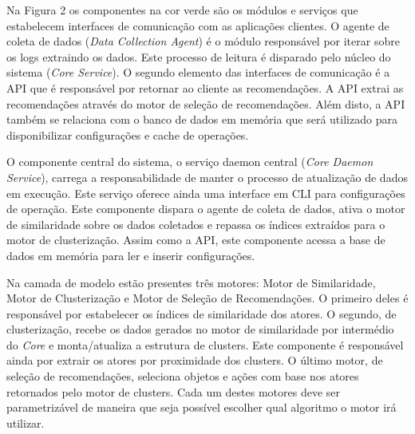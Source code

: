 \documentclass[
	12pt,				%
    oneside,			%
	a4paper,			%
	english,			%
	french,				%
	spanish,			%
	brazil,				%
	]{abntex2}
\begin{document}
Na Figura 2 os componentes na cor verde são os módulos e serviços que estabelecem interfaces de comunicação com as aplicações clientes. O agente de coleta de dados (\textit{Data Collection Agent}) é o módulo responsável por iterar sobre os
logs extraindo os dados. Este processo de leitura é disparado pelo núcleo do sistema (\textit{Core Service}).
O segundo elemento das interfaces de comunicação é a API que é responsável por retornar ao cliente as recomendações. A API extrai as recomendações através do motor de seleção de recomendações. Além disto, a API também se relaciona com o banco
de dados em memória que será utilizado para disponibilizar configurações e cache de operações.

O componente central do sistema, o serviço daemon central (\textit{Core Daemon Service}), carrega a responsabilidade de manter o processo de atualização de dados em execução. Este serviço oferece ainda uma interface em CLI para configurações
de operação. Este componente dispara o agente de coleta de dados, ativa o motor de similaridade sobre os dados coletados e repassa os índices extraídos para o motor de clusterização. Assim como a API, este componente acessa a base de dados
em memória para ler e inserir configurações.

Na camada de modelo estão presentes três motores: Motor de Similaridade, Motor de Clusterização e Motor de Seleção de Recomendações. O primeiro deles é responsável por estabelecer os índices de similaridade dos atores. O segundo, de 
clusterização, recebe os dados gerados no motor de similaridade por intermédio do \textit{Core} e monta/atualiza a estrutura de clusters. Este componente é responsável ainda por extrair os atores por proximidade dos clusters. O último
motor, de seleção de recomendações, seleciona objetos e ações com base nos atores retornados pelo motor de clusters. Cada um destes motores deve ser parametrizável de maneira que seja possível escolher qual algoritmo o motor irá utilizar.
\end{document}
